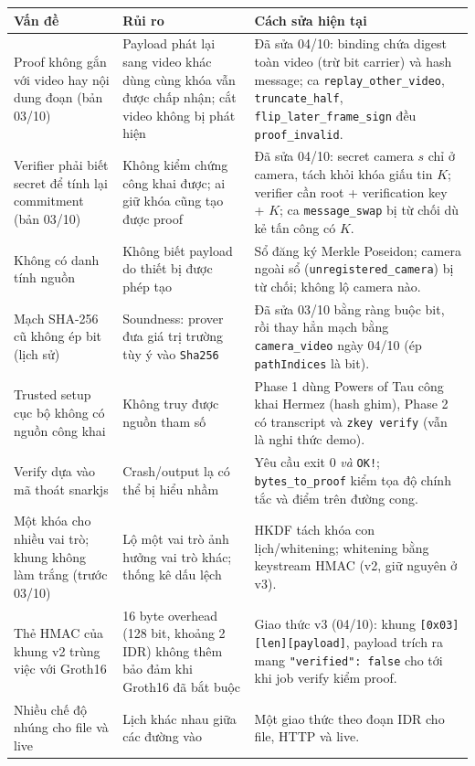 \documentclass[10pt,a4paper]{article}
\begin{document}
\begin{longtable}{@{}p{.25\linewidth}p{.33\linewidth}p{.36\linewidth}@{}}
\toprule
\textbf{Vấn đề} & \textbf{Rủi ro} & \textbf{Cách sửa hiện tại}\tabularnewline
\midrule\endhead
Proof không gắn với video hay nội dung đoạn (bản 03/10) & Payload phát lại sang video khác dùng cùng khóa vẫn được chấp nhận; cắt video không bị phát hiện & Đã sửa 04/10: binding chứa digest toàn video (trừ bit carrier) và hash message; ca \texttt{replay\_other\_video}, \texttt{truncate\_half}, \texttt{flip\_later\_frame\_sign} đều \texttt{proof\_invalid}.\\
Verifier phải biết secret để tính lại commitment (bản 03/10) & Không kiểm chứng công khai được; ai giữ khóa cũng tạo được proof & Đã sửa 04/10: secret camera $s$ chỉ ở camera, tách khỏi khóa giấu tin $K$; verifier cần root + verification key + $K$; ca \texttt{message\_swap} bị từ chối dù kẻ tấn công có $K$.\\
Không có danh tính nguồn & Không biết payload do thiết bị được phép tạo & Sổ đăng ký Merkle Poseidon; camera ngoài sổ (\texttt{unregistered\_camera}) bị từ chối; không lộ camera nào.\\
Mạch SHA-256 cũ không ép bit (lịch sử) & Soundness: prover đưa giá trị trường tùy ý vào \texttt{Sha256} & Đã sửa 03/10 bằng ràng buộc bit, rồi thay hẳn mạch bằng \texttt{camera\_video} ngày 04/10 (ép \texttt{pathIndices} là bit).\\
Trusted setup cục bộ không có nguồn công khai & Không truy được nguồn tham số & Phase 1 dùng Powers of Tau công khai Hermez (hash ghim), Phase 2 có transcript và \texttt{zkey verify} (vẫn là nghi thức demo).\\
Verify dựa vào mã thoát snarkjs & Crash/output lạ có thể bị hiểu nhầm & Yêu cầu exit 0 \emph{và} \texttt{OK!}; \texttt{bytes\_to\_proof} kiểm tọa độ chính tắc và điểm trên đường cong.\\
Một khóa cho nhiều vai trò; khung không làm trắng (trước 03/10) & Lộ một vai trò ảnh hưởng vai trò khác; thống kê dấu lệch & HKDF tách khóa con lịch/whitening; whitening bằng keystream HMAC (v2, giữ nguyên ở v3).\\
Thẻ HMAC của khung v2 trùng việc với Groth16 & 16 byte overhead (128 bit, khoảng 2 IDR) không thêm bảo đảm khi Groth16 đã bắt buộc & Giao thức v3 (04/10): khung \texttt{[0x03][len][payload]}, payload trích ra mang \texttt{"verified": false} cho tới khi job verify kiểm proof.\\
Nhiều chế độ nhúng cho file và live & Lịch khác nhau giữa các đường vào & Một giao thức theo đoạn IDR cho file, HTTP và live.\\

\end{longtable}
\end{document}
